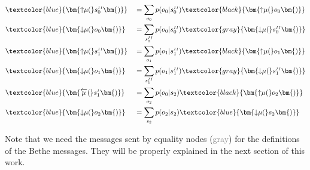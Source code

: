 \begin{minipage}[t]{0.5\textwidth}
    \setlength{\abovedisplayskip}{0pt}
    \setlength{\belowdisplayskip}{0pt}
    \begin{alignat}{2}
         & \textcolor{blue}{\bm{{\uparrow}{\mu}(}s^{\scriptscriptstyle II}_0\bm{)}}    &  & = \sum_{o_0} p(o_0|s^{\scriptscriptstyle II}_0) \textcolor{black}{\bm{{\uparrow}{\mu}(}o_0\bm{)}}                                                  \\
         & \textcolor{blue}{\bm{{\downarrow}{\mu}(}o_0\bm{)}}                          &  & = \sum_{s^{\scriptscriptstyle II}_0} p(o_0|s^{\scriptscriptstyle II}_0) \textcolor{gray}{\bm{{\downarrow}{\mu}(}s^{\scriptscriptstyle II}_0\bm{)}} \\
         & \textcolor{blue}{\bm{{\uparrow}{\mu}(}s^{\scriptscriptstyle II}_1\bm{)}}    &  & = \sum_{o_1} p(o_1|s^{\scriptscriptstyle II}_1) \textcolor{black}{\bm{{\uparrow}{\mu}(}o_1\bm{)}}                                                  \\
         & \textcolor{blue}{\bm{{\downarrow}{\mu}(}o_1\bm{)}}                          &  & = \sum_{s^{\scriptscriptstyle II}_1} p(o_1|s^{\scriptscriptstyle II}_1) \textcolor{gray}{\bm{{\downarrow}{\mu}(}s^{\scriptscriptstyle II}_1\bm{)}} \\
         & \textcolor{blue}{\bm{\overleftarrow{\mu}(}s^{\scriptscriptstyle I}_1\bm{)}} &  & = \sum_{o_2} p(o_0|s_2) \textcolor{black}{\bm{{\uparrow}{\mu}(}o_2\bm{)}}                                                                          \\
         & \textcolor{blue}{\bm{{\downarrow}{\mu}(}o_2\bm{)}}                          &  & = \sum_{s_2} p(o_2|s_2) \textcolor{blue}{\bm{{\downarrow}{\mu}(}s_2\bm{)}}
    \end{alignat}
\end{minipage}
\vspace{1em}

Note that we need the messages sent by equality nodes (\textcolor{gray}{gray}) for the definitions of the Bethe messages. They will be properly explained in the next section of this work.


